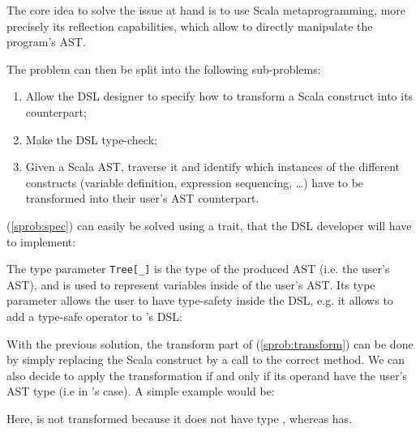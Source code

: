 \newcommand{\treetype}[0]{\lstinline{Tree[_]}}

The core idea to solve the issue at hand is to use Scala metaprogramming,
more precisely its reflection capabilities, which allow to directly manipulate the program's AST.

The problem can then be split into the following sub-problems:
\begin{enumerate}
    \item Allow the DSL designer to specify how to transform a Scala construct into its counterpart; \label{sprob:spec}
    \item Make the DSL type-check; \label{sprob:typecheck}
    \item Given a Scala AST, traverse it and identify which instances of the different constructs (variable definition, expression sequencing, \ldots{}) have to be transformed into their user's AST counterpart. \label{sprob:transform}
\end{enumerate}
\newcommand{\refprob}[1]{{(\ref{sprob:#1})}}


\refprob{spec} can easily be solved using a trait,
that the DSL developer will have to implement:
\vspace{4em}

The type parameter \treetype{} is the type of the produced AST (i.e. the user's AST), and  is used to represent variables inside of the user's AST. 
Its type parameter allows the user to have type-safety inside the DSL, e.g.
it allows to add a type-safe \scalasnippet{+} operator to \rob{}'s DSL:



With the previous solution,
the transform part of \refprob{transform} can be done by simply replacing the Scala construct by a call to the correct method. 
We can also decide to apply the transformation if and only if its operand have the user's AST type (i.e  in \rob{}'s case). A simple example would be:


Here,  is not transformed because it does not have type , whereas
 has.

